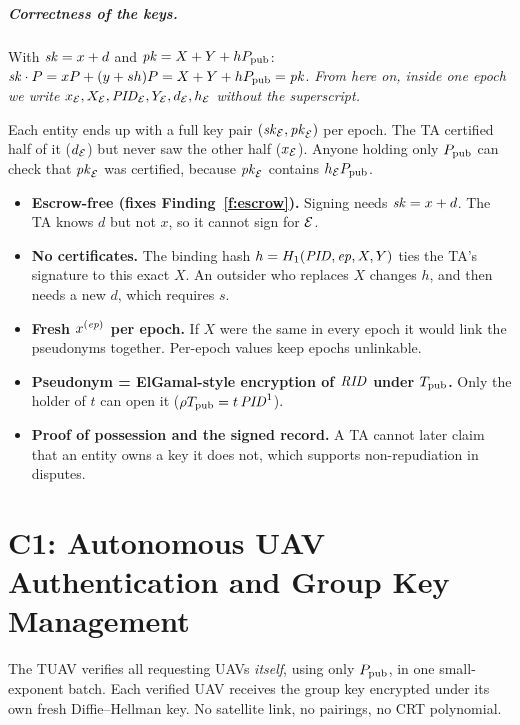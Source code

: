 \paragraph{Correctness of the keys.} With $\mathit{sk}=x+d$ and $\mathit{pk}=X+Y+hP_{\mathrm{pub}}$:\;
$\mathit{sk}\cdot P=xP+(y+sh)P=X+Y+hP_{\mathrm{pub}}=\mathit{pk}$.
\emph{From here on, inside one epoch we write $x_{\mathcal{E}},X_{\mathcal{E}},\mathit{PID}_{\mathcal{E}},Y_{\mathcal{E}},d_{\mathcal{E}},h_{\mathcal{E}}$ without the superscript.}

\begin{whatbox}
Each entity ends up with a full key pair $(\mathit{sk}_{\mathcal{E}},\mathit{pk}_{\mathcal{E}})$ per epoch. The TA certified half of it ($d_{\mathcal{E}}$) but never saw the other half ($x_{\mathcal{E}}$).
Anyone holding only $P_{\mathrm{pub}}$ can check that $\mathit{pk}_{\mathcal{E}}$ was certified, because $\mathit{pk}_{\mathcal{E}}$ contains $h_{\mathcal{E}}P_{\mathrm{pub}}$.
\end{whatbox}
\begin{whybox}
\begin{itemize}[leftmargin=*]
  \item \textbf{Escrow-free (fixes Finding~\ref{f:escrow}).} Signing needs $\mathit{sk}=x+d$. The TA knows $d$ but not $x$, so it cannot sign for $\mathcal{E}$.
  \item \textbf{No certificates.} The binding hash $h=H_1(\mathit{PID},\mathit{ep},X,Y)$ ties the TA's signature to this exact $X$. An outsider who replaces $X$ changes
        $h$, and then needs a new $d$, which requires $s$.
  \item \textbf{Fresh $x^{(\mathit{ep})}$ per epoch.} If $X$ were the same in every epoch it would link the pseudonyms together. Per-epoch values keep epochs unlinkable.
  \item \textbf{Pseudonym = ElGamal-style encryption of $\mathit{RID}$ under $T_{\mathrm{pub}}$.} Only the holder of $t$ can open it ($\rho T_{\mathrm{pub}}=t\,\mathit{PID}^1$).
  \item \textbf{Proof of possession and the signed record.} A TA cannot later claim that an entity owns a key it does not, which supports non-repudiation in disputes.
\end{itemize}
\end{whybox}

\chapter{C1: Autonomous UAV Authentication and Group Key Management}\label{sec:c1}
\begin{keybox}
The TUAV verifies all requesting UAVs \emph{itself}, using only $P_{\mathrm{pub}}$, in one small-exponent batch. Each verified UAV receives the
group key encrypted under its own fresh Diffie--Hellman key. No satellite link, no pairings, no CRT polynomial.
\end{keybox}

